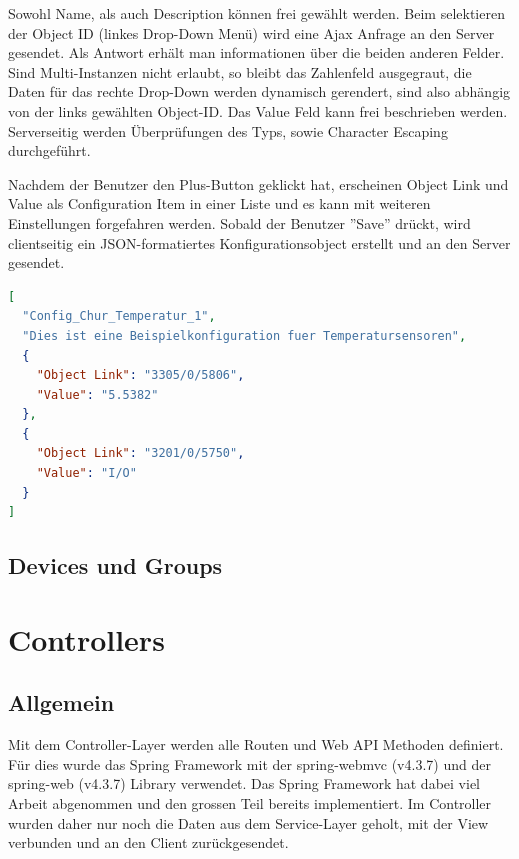 Sowohl Name, als auch Description können frei gewählt werden. Beim selektieren der Object ID (linkes Drop-Down Menü) wird eine Ajax Anfrage an den Server gesendet. Als Antwort erhält man informationen über die beiden anderen Felder. Sind Multi-Instanzen nicht erlaubt, so bleibt das Zahlenfeld ausgegraut, die Daten für das rechte Drop-Down werden dynamisch gerendert, sind also abhängig von der links gewählten Object-ID. Das Value Feld kann frei beschrieben werden. Serverseitig werden Überprüfungen des Typs, sowie Character Escaping durchgeführt.

Nachdem der Benutzer den Plus-Button geklickt hat, erscheinen Object Link und Value als Configuration Item in einer Liste und es kann mit weiteren Einstellungen forgefahren werden. Sobald der Benutzer ''Save'' drückt, wird clientseitig ein JSON-formatiertes Konfigurationsobject erstellt und an den Server gesendet.

\begin{lstlisting}[language=json]
[
  "Config_Chur_Temperatur_1", 
  "Dies ist eine Beispielkonfiguration fuer Temperatursensoren", 
  {
	"Object Link": "3305/0/5806",
	"Value": "5.5382"
  }, 
  {
	"Object Link": "3201/0/5750",
	"Value": "I/O"
  }
]
\end{lstlisting}



\subsection{Devices und Groups}







\newpage

\section{Controllers}
\subsection{Allgemein}
Mit dem Controller-Layer werden alle Routen und Web API Methoden definiert. Für dies wurde das Spring Framework mit der spring-webmvc (v4.3.7) und der spring-web (v4.3.7) Library verwendet. Das Spring Framework hat dabei viel Arbeit abgenommen und den grossen Teil bereits implementiert. Im Controller wurden daher nur noch die Daten aus dem Service-Layer geholt, mit der View verbunden und an den Client zurückgesendet.

